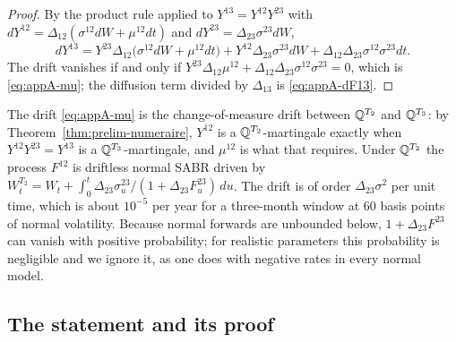 \documentclass[../../main.tex]{subfiles}
\begin{document}
\begin{proof}
By the product rule \cite[Thm.~3.3.6]{karatzas1991} applied to $Y^{13}=Y^{12}Y^{23}$ with $dY^{12}=\Delta_{12}(\sigma^{12}dW+\mu^{12}dt)$ and $dY^{23}=\Delta_{23}\sigma^{23}dW$,
\[
dY^{13}=Y^{23}\Delta_{12}\big(\sigma^{12}dW+\mu^{12}dt\big)+Y^{12}\Delta_{23}\sigma^{23}dW+\Delta_{12}\Delta_{23}\sigma^{12}\sigma^{23}dt .
\]
The drift vanishes if and only if $Y^{23}\Delta_{12}\mu^{12}+\Delta_{12}\Delta_{23}\sigma^{12}\sigma^{23}=0$, which is \eqref{eq:appA-mu}; the diffusion term divided by $\Delta_{13}$ is \eqref{eq:appA-dF13}.
\end{proof}

The drift \eqref{eq:appA-mu} is the change-of-measure drift between $\mathbb{Q}^{T_2}$ and $\mathbb{Q}^{T_3}$: by Theorem~\ref{thm:prelim-numeraire}, $Y^{12}$ is a $\mathbb{Q}^{T_2}$-martingale exactly when $Y^{12}Y^{23}=Y^{13}$ is a $\mathbb{Q}^{T_3}$-martingale, and $\mu^{12}$ is what that requires. Under $\mathbb{Q}^{T_2}$ the process $F^{12}$ is driftless normal SABR driven by $W^{T_2}_t=W_t+\int_0^t\Delta_{23}\sigma^{23}_u/(1+\Delta_{23}F^{23}_u)\,du$. The drift is of order $\Delta_{23}\sigma^2$ per unit time, which is about $10^{-5}$ per year for a three-month window at $60$ basis points of normal volatility. Because normal forwards are unbounded below, $1+\Delta_{23}F^{23}$ can vanish with positive probability; for realistic parameters this probability is negligible and we ignore it, as one does with negative rates in every normal model.

\subsection{The statement and its proof}
\end{document}
